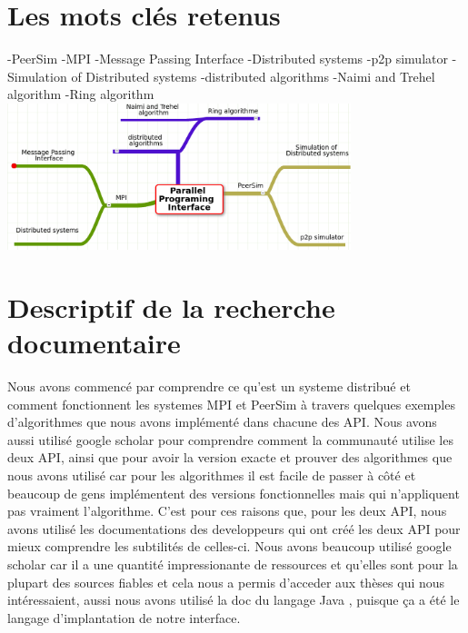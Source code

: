 \documentclass{article}
\begin{document}
		\section{Les mots clés retenus}
		-PeerSim
		\newline
		-MPI
		\newline
		-Message Passing Interface
		\newline
		-Distributed systems
		\newline
		-p2p simulator
		\newline
		-Simulation of Distributed systems
		\newline
		-distributed algorithms
		\newline
		-Naimi and Trehel algorithm
		\newline
		-Ring algorithm
		\newline 
		\includegraphics[width=10cm]{mindmap.png}
		\newpage		
		\section{Descriptif de la recherche documentaire}
		\indent Nous avons commencé par comprendre ce qu'est un systeme distribué et comment fonctionnent les systemes MPI et PeerSim à travers quelques exemples d'algorithmes que nous avons implémenté dans chacune des API. 
		\newline
		\indent	
Nous avons aussi utilisé google scholar pour comprendre comment la communauté utilise les deux API, ainsi que pour avoir la version exacte et prouver des algorithmes que nous avons utilisé car pour les algorithmes il est facile de passer à côté et beaucoup de gens implémentent des versions fonctionnelles mais qui n'appliquent pas vraiment l'algorithme.
		\newline
		\indent
 C'est pour ces raisons que, pour les deux API, nous avons utilisé les documentations des developpeurs qui ont créé les deux API pour mieux comprendre les subtilités de celles-ci.
		\newline
		\indent Nous avons beaucoup utilisé google scholar car il a une quantité impressionante de ressources et qu'elles sont pour la plupart des sources fiables et cela nous a permis d'acceder aux thèses qui nous intéressaient, aussi nous avons utilisé la doc du langage Java , puisque ça a été le langage d'implantation de notre interface.
\end{document}
